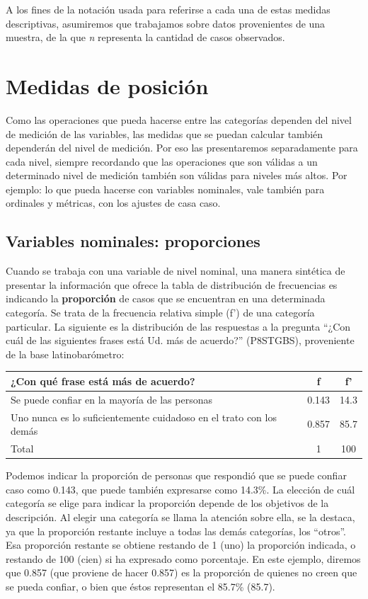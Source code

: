\documentclass[]{book}
\begin{document}
A los fines de la notación usada para referirse a cada una de estas
medidas descriptivas, asumiremos que trabajamos sobre datos provenientes de una muestra, de la que \emph{n} representa la cantidad de casos observados.

\hypertarget{medidas-de-posiciuxf3n}{%
\section{Medidas de posición}\label{medidas-de-posiciuxf3n}}

Como las operaciones que pueda hacerse entre las categorías dependen del nivel de medición de las variables, las medidas que se puedan calcular también dependerán del nivel de medición. Por eso las presentaremos separadamente para cada nivel, siempre recordando que las operaciones que son válidas a un determinado nivel de medición también son válidas para niveles más altos. Por ejemplo: lo que pueda hacerse con variables nominales, vale también para ordinales y métricas, con los ajustes de casa caso.

\hypertarget{variables-nominales-proporciones}{%
\subsection{Variables nominales: proporciones}\label{variables-nominales-proporciones}}

Cuando se trabaja con una variable de nivel nominal, una manera
sintética de presentar la información que ofrece la tabla de
distribución de frecuencias es indicando la \textbf{proporción} de casos que se encuentran en una determinada categoría. Se trata de la frecuencia relativa simple (f') de una categoría particular. La siguiente es la distribución de las respuestas a la pregunta ``¿Con cuál de las siguientes frases está Ud. más de acuerdo?'' (P8STGBS), proveniente de la base latinobarómetro:

\begin{longtable}[]{@{}lcc@{}}
\toprule
¿Con qué frase está más de acuerdo? & f & f'\tabularnewline
\midrule
\endhead
Se puede confiar en la mayoría de las personas & 0.143 & 14.3\tabularnewline
Uno nunca es lo suficientemente cuidadoso en el trato con los demás & 0.857 & 85.7\tabularnewline
Total & 1 & 100\tabularnewline
\bottomrule
\end{longtable}

Podemos indicar la proporción de personas que respondió que se puede confiar caso como 0.143, que puede también expresarse como 14.3\%. La elección de cuál categoría se elige para indicar la proporción depende de los objetivos de la descripción. Al elegir una categoría se llama la atención sobre ella, se la destaca, ya que la proporción restante incluye a todas las demás categorías, los ``otros''. Esa proporción restante se obtiene restando de 1 (uno) la proporción indicada, o restando de 100 (cien) si ha expresado como porcentaje. En este ejemplo, diremos que 0.857 (que proviene de hacer 0.857) es la proporción de quienes no creen que se pueda confiar, o bien que éstos representan el 85.7\% (85.7).
\end{document}
